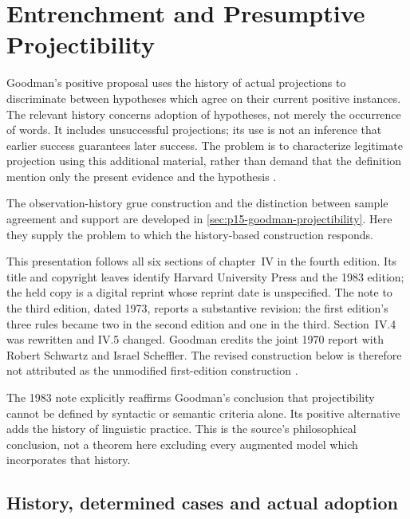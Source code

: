 \chapter{Entrenchment and Presumptive Projectibility}
\label{sec:p15-goodman-entrenchment-and-projectibility}

Goodman's positive proposal uses the history of actual projections to
discriminate between hypotheses which agree on their current positive
instances. The relevant history concerns adoption of hypotheses, not
merely the occurrence of words. It includes unsuccessful projections;
its use is not an inference that earlier success guarantees later success.
The problem is to characterize legitimate projection using this additional
material, rather than demand that the definition mention only the present
evidence and the hypothesis \parencite[IV.1, pp.~84--87]{Goodman1983FourthProjection}.

The observation-history grue construction and the distinction between
sample agreement and support are developed in
\cref{sec:p15-goodman-projectibility}. Here they supply the problem to
which the history-based construction responds.

This presentation follows all six sections of chapter~IV in the fourth
edition. Its title and copyright leaves identify Harvard University Press
and the 1983 edition; the held copy is a digital reprint whose reprint date
is unspecified. The note to the third edition, dated 1973, reports a
substantive revision: the first edition's three rules became two in the
second edition and one in the third. Section~IV.4 was rewritten and IV.5
changed. Goodman credits the joint 1970 report with Robert Schwartz and
Israel Scheffler. The revised construction below is therefore not
attributed as the unmodified first-edition construction
\parencite[pp.~xxi--xxv]{Goodman1983FourthProjection}.

The 1983 note explicitly reaffirms Goodman's conclusion that projectibility
cannot be defined by syntactic or semantic criteria alone. Its positive
alternative adds the history of linguistic practice. This is the source's
philosophical conclusion, not a theorem here excluding every augmented
model which incorporates that history.

\section{History, determined cases and actual adoption}
\label{sec:p15-goodman-projection-history}

